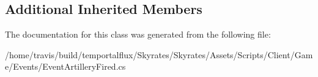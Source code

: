 \subsection*{Additional Inherited Members}


The documentation for this class was generated from the following file\-:\begin{DoxyCompactItemize}
\item 
/home/travis/build/temportalflux/\-Skyrates/\-Skyrates/\-Assets/\-Scripts/\-Client/\-Game/\-Events/Event\-Artillery\-Fired.\-cs\end{DoxyCompactItemize}
